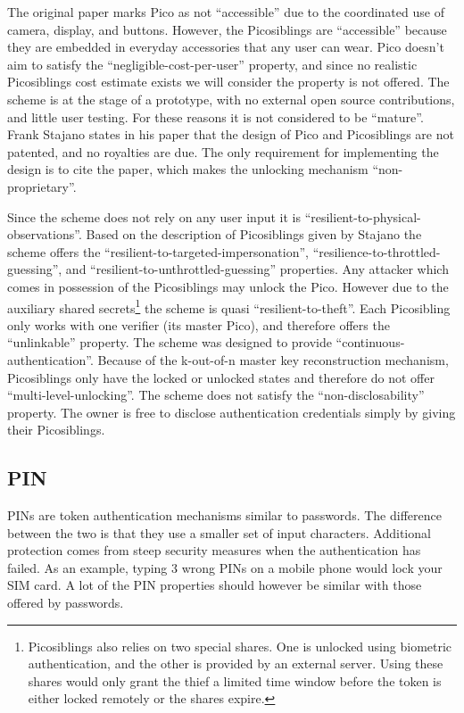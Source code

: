 	The original paper marks Pico as not ``accessible'' due to the coordinated use of camera, display, and buttons. However, the Picosiblings are ``accessible'' because they are embedded in everyday accessories that any user can wear. Pico doesn't aim to satisfy the ``negligible-cost-per-user'' property, and since no realistic Picosiblings cost estimate exists we will consider the property is not offered. The scheme is at the stage of a prototype, with no external open source contributions, and little user testing. For these reasons it is not considered to be ``mature''. Frank Stajano states in his paper \cite{stajano2011pico} that the design of Pico and Picosiblings are not patented, and no royalties are due. The only requirement for implementing the design is to cite the paper, which makes the unlocking mechanism ``non-proprietary''.
	
	Since the scheme does not rely on any user input it is ``resilient-to-physical-observations''. Based on the description of Picosiblings given by Stajano \cite{stajano2011pico} the scheme offers the ``resilient-to-targeted-impersonation'', ``resilience-to-throttled-guessing'', and ``resilient-to-unthrottled-guessing'' properties. Any attacker which comes in possession of the Picosiblings may unlock the Pico. However due to the auxiliary shared secrets\footnote{Picosiblings also relies on two special shares. One is unlocked using biometric authentication, and the other is provided by an external server. Using these shares would only grant the thief a limited time window before the token is either locked remotely or the shares expire.} the scheme is quasi ``resilient-to-theft''. Each Picosibling only works with one verifier (its master Pico), and therefore offers the ``unlinkable'' property. The scheme was designed to provide ``continuous-authentication''. Because of the k-out-of-n master key reconstruction mechanism, Picosiblings only have the locked or unlocked states and therefore do not offer ``multi-level-unlocking''. The scheme does not satisfy the ``non-disclosability'' property. The owner is free to disclose authentication credentials simply by giving their Picosiblings.
	
	\subsection{PIN}
	PINs are token authentication mechanisms similar to passwords. The difference between the two is that they use a smaller set of input characters. Additional protection comes from steep security measures when the authentication has failed. As an example, typing 3 wrong PINs on a mobile phone would lock your SIM card. A lot of the PIN properties should however be similar with those offered by passwords.
	
